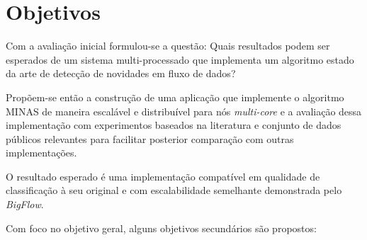 \section{Objetivos}

Com a avaliação inicial formulou-se a questão: Quais resultados podem ser
esperados de um sistema multi-processado que implementa um algoritmo estado da
arte de detecção de novidades em fluxo de dados?

% 

Propõem-se então a construção de uma aplicação que implemente o algoritmo MINAS
de maneira escalável e distribuível para nós \emph{multi-core} e a avaliação
dessa implementação com experimentos baseados na literatura e conjunto de dados
públicos relevantes para facilitar posterior comparação com outras
implementações.

O resultado esperado é uma implementação compatível em qualidade de
classificação à seu original e com escalabilidade semelhante demonstrada pelo
\emph{BigFlow}.



Com foco no objetivo geral, alguns objetivos secundários são propostos:


